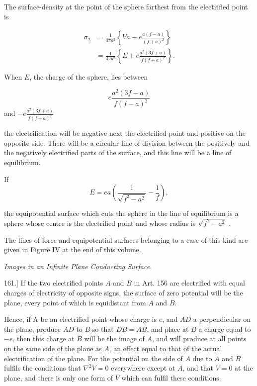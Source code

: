 \documentclass[11pt,a4paper]{article}
\begin{document}
The surface-density at the point of the sphere farthest from the electrified point is

\begin{equation}\tag{13}
\begin{split}
\sigma_2&=\frac{1}{4\pi a^2}
\left\{Va-e\frac{a(f-a)}{(f+a)^2}\right\}\\
&=\frac{1}{4\pi a^2}
\left\{E+e\frac{a^2(3f+a)}{f(f+a)^2}\right\}.
\end{split}
\end{equation}

When $E$, the charge of the sphere, lies between

\[
e\frac{a^2(3f-a)}{f(f-a)^2}
\]
and $-e\frac{a^2(3f+a)}{f(f+a)^2}$

the electrification will be negative next the electrified point and positive on the opposite side. There will be a circular line of division between the positively and the negatively electrified parts of the surface, and this line will be a line of equilibrium.

If
\begin{equation}\tag{14}
E=ea\left(\frac{1}{\sqrt{f^2-a^2}}-\frac{1}{f}\right),
\end{equation}

the equipotential surface which cuts the sphere in the line of equilibrium is a sphere whose centre is the electrified point and whose radius is  $\sqrt{f^2-a^2}$ .

The lines of force and equipotential surfaces belonging to a case of this kind are given in Figure IV at the end of this volume.

{\centering\itshape Images in an Infinite Plane Conducting Surface.\par}

161.] If the two electrified points $A$ and $B$ in Art. 156 are electrified with equal charges of electricity of opposite signs, the surface of zero potential will be the plane, every point of which is equidistant from $A$ and $B$.

\setcounter{footnote}{0}
Hence, if A be an electrified point whose charge is $e$, and $AD$
a perpendicular on the plane, produce $AD$ to $B$ so that $DB=AB$,
and place at $B$ a charge equal to $-e$, then this charge at $B$
will be the image of $A$, and will produce at all points on the same
side of the plane as $A$, an effect equal to that of the actual
electrification of the plane. For the potential on the side of $A$
due to $A$ and $B$ fulfils the conditions that $\nabla^2 V=0$
everywhere except at $A$, and that $V=0$ at the plane, and there is
only one form of $V$ which can fulfil these conditions.
\end{document}
